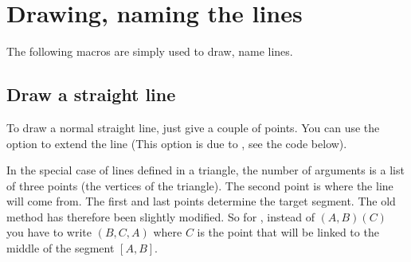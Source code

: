 \begin{tkzexample}[latex=6.5cm,small]
\end{tkzexample}


\section{Drawing, naming the lines}

The following macros are simply used to draw, name lines.

\subsection{Draw a straight line}

To draw a normal straight line, just give a couple of points. You can  use the
 option to extend the line (This option is due to , see the code below).

\begin{tkzltxexample}[small]
\end{tkzltxexample}

In the special case of lines defined in a triangle, the number of arguments is a
list of three points (the vertices of the triangle). The second point is where
the line will come from. The first and last points determine the target segment.
The old method has therefore been slightly modified. So for
, instead of $(A,B)(C)$ you have to write $(B,C,A)$
where $C$ is the point that will be linked to the middle of the segment $[A,B]$.

